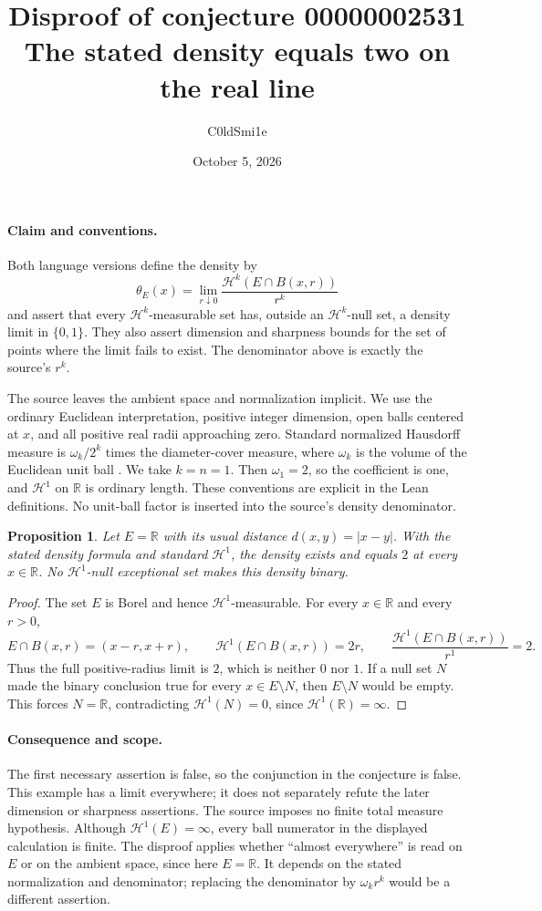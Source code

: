 \documentclass[11pt]{article}
\title{Disproof of conjecture 00000002531\\\large The stated density equals two on the real line}
\author{C0ldSmi1e}
\date{October 5, 2026}
\newtheorem{proposition}{Proposition}
\newcommand{\R}{\mathbb{R}}
\newcommand{\HH}{\mathcal{H}}
\begin{document}
\maketitle

\paragraph{Claim and conventions.}
Both language versions define the density by
\[
 \theta_E(x)=\lim_{r\downarrow0}\frac{\HH^k(E\cap B(x,r))}{r^k}
\]
and assert that every $\HH^k$-measurable set has, outside an $\HH^k$-null
set, a density limit in $\{0,1\}$. They also assert dimension and sharpness
bounds for the set of points where the limit fails to exist. The denominator
above is exactly the source's $r^k$.

The source leaves the ambient space and normalization implicit. We use the
ordinary Euclidean interpretation, positive integer dimension, open balls
centered at $x$, and all positive real radii approaching zero. Standard
normalized Hausdorff measure is $\omega_k/2^k$ times the diameter-cover
measure, where $\omega_k$ is the volume of the Euclidean unit ball
\cite{Simon}. We take $k=n=1$. Then $\omega_1=2$, so the coefficient is
one, and $\HH^1$ on $\R$ is ordinary length. These conventions are explicit
in the Lean definitions. No unit-ball factor is inserted into the source's
density denominator.

\begin{proposition}
Let $E=\R$ with its usual distance $d(x,y)=|x-y|$. With the stated density
formula and standard $\HH^1$, the density exists and equals $2$ at every
$x\in\R$. No $\HH^1$-null exceptional set makes this density binary.
\end{proposition}
\begin{proof}
The set $E$ is Borel and hence $\HH^1$-measurable. For every $x\in\R$
and every $r>0$,
\[
 E\cap B(x,r)=(x-r,x+r),\qquad
 \HH^1(E\cap B(x,r))=2r,\qquad
 \frac{\HH^1(E\cap B(x,r))}{r^1}=2.
\]
Thus the full positive-radius limit is $2$, which is neither $0$ nor $1$.
If a null set $N$ made the binary conclusion true for every $x\in E\setminus N$,
then $E\setminus N$ would be empty. This forces $N=\R$, contradicting
$\HH^1(N)=0$, since $\HH^1(\R)=\infty$.
\end{proof}

\paragraph{Consequence and scope.}
The first necessary assertion is false, so the conjunction in the conjecture
is false. This example has a limit everywhere; it does not separately refute
the later dimension or sharpness assertions. The source imposes no finite
total measure hypothesis. Although $\HH^1(E)=\infty$, every ball numerator
in the displayed calculation is finite. The disproof applies whether
``almost everywhere'' is read on $E$ or on the ambient space, since here
$E=\R$. It depends on the stated normalization and denominator; replacing
the denominator by $\omega_k r^k$ would be a different assertion.
\end{document}
